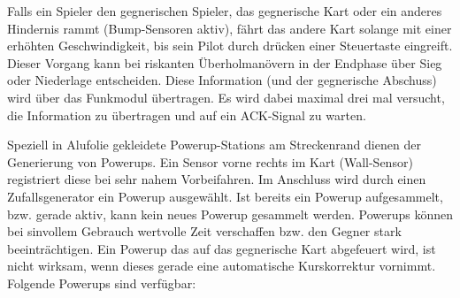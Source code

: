 Falls ein Spieler den gegnerischen Spieler, das gegnerische Kart oder ein anderes Hindernis rammt (Bump-Sensoren aktiv), fährt das andere Kart solange mit einer erhöhten Geschwindigkeit, bis sein Pilot durch drücken einer Steuertaste eingreift. Dieser Vorgang kann bei riskanten Überholmanövern in der Endphase über Sieg oder Niederlage entscheiden. Diese Information (und der gegnerische Abschuss) wird über das Funkmodul übertragen. Es wird dabei maximal drei mal versucht, die Information zu übertragen und auf ein ACK-Signal zu warten. 

Speziell in Alufolie gekleidete Powerup-Stations am Streckenrand dienen der Generierung von Powerups. Ein Sensor vorne rechts im Kart (Wall-Sensor) registriert diese bei sehr nahem Vorbeifahren. Im Anschluss wird durch einen Zufallsgenerator ein Powerup ausgewählt. Ist bereits ein Powerup aufgesammelt, bzw. gerade aktiv, kann kein neues Powerup gesammelt werden. Powerups können bei sinvollem Gebrauch wertvolle Zeit verschaffen bzw. den Gegner stark beeinträchtigen. Ein Powerup das auf das gegnerische Kart abgefeuert wird, ist nicht wirksam, wenn dieses gerade eine automatische Kurskorrektur vornimmt. Folgende Powerups sind verfügbar: 

